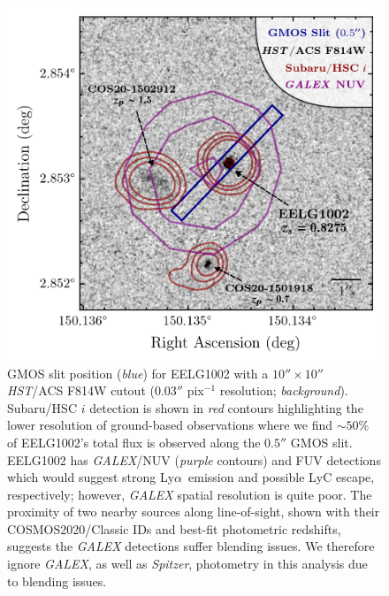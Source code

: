 \documentclass[twocolumn,tight,times,linenumbers]{aastex631}
\newcommand{\lya}{Ly$\alpha$}
\begin{document}
		\begin{figure}
			\centering
			\includegraphics[width=\columnwidth]{figures/slit_pos.png}
			\caption{GMOS slit position (\textit{blue}) for EELG1002 with a $10'' \times 10''$ \textit{HST}/ACS F814W cutout ($0.03''$ pix$^{-1}$ resolution; \textit{background}). Subaru/HSC $i$ detection is shown in \textit{red} contours highlighting the lower resolution of ground-based observations where we find $\sim 50$\% of EELG1002's total flux is observed along the $0.5''$ GMOS slit. EELG1002 has \textit{GALEX}/NUV (\textit{purple} contours) and FUV detections which would suggest strong \lya~emission and possible LyC escape, respectively; however, \textit{GALEX} spatial resolution is quite poor. The proximity of two nearby sources along line-of-sight, shown with their COSMOS2020/Classic IDs and best-fit photometric redshifts, suggests the \textit{GALEX} detections suffer blending issues. We therefore ignore \textit{GALEX}, as well as \textit{Spitzer}, photometry in this analysis due to blending issues.}
			\label{fig:slitpos}
		\end{figure}
	
\end{document}
